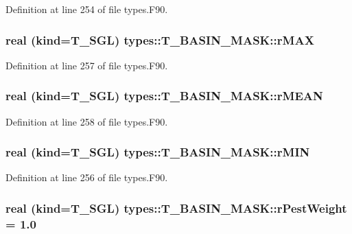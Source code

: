 Definition at line 254 of file types.F90.

\hypertarget{typetypes_1_1_t___b_a_s_i_n___m_a_s_k_adec4aa4e75d409d183341d4b1657e6bc}{
\subsubsection[{rMAX}]{\setlength{\rightskip}{0pt plus 5cm}real (kind={\bf T\_\-SGL}) {\bf types::T\_\-BASIN\_\-MASK::rMAX}}}
\label{typetypes_1_1_t___b_a_s_i_n___m_a_s_k_adec4aa4e75d409d183341d4b1657e6bc}


Definition at line 257 of file types.F90.

\hypertarget{typetypes_1_1_t___b_a_s_i_n___m_a_s_k_a0c53ee195cfab0c097f2a46bd7d56439}{
\subsubsection[{rMEAN}]{\setlength{\rightskip}{0pt plus 5cm}real (kind={\bf T\_\-SGL}) {\bf types::T\_\-BASIN\_\-MASK::rMEAN}}}
\label{typetypes_1_1_t___b_a_s_i_n___m_a_s_k_a0c53ee195cfab0c097f2a46bd7d56439}


Definition at line 258 of file types.F90.

\hypertarget{typetypes_1_1_t___b_a_s_i_n___m_a_s_k_a77f0f564fb85e20fb286772f1894c2d3}{
\subsubsection[{rMIN}]{\setlength{\rightskip}{0pt plus 5cm}real (kind={\bf T\_\-SGL}) {\bf types::T\_\-BASIN\_\-MASK::rMIN}}}
\label{typetypes_1_1_t___b_a_s_i_n___m_a_s_k_a77f0f564fb85e20fb286772f1894c2d3}


Definition at line 256 of file types.F90.

\hypertarget{typetypes_1_1_t___b_a_s_i_n___m_a_s_k_a2dc814f4cd552f347e163e6fc9844f6c}{
\subsubsection[{rPestWeight}]{\setlength{\rightskip}{0pt plus 5cm}real (kind={\bf T\_\-SGL}) {\bf types::T\_\-BASIN\_\-MASK::rPestWeight} = 1.0}}
\label{typetypes_1_1_t___b_a_s_i_n___m_a_s_k_a2dc814f4cd552f347e163e6fc9844f6c}


